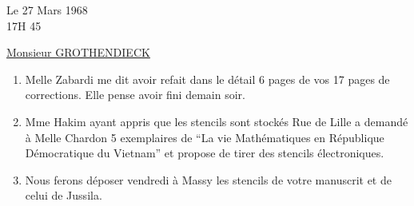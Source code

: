 \begin{flushright}
Le 27 Mars 1968\\
17H 45\\
\end{flushright}

\begin{center}
\uline{Monsieur GROTHENDIECK}\\
\end{center}

\begin{enumerate}[label=\arabic*.]
\item Melle Zabardi me dit avoir refait dans le détail 6 pages de vos 17 pages de corrections. Elle pense avoir fini demain soir.

\item Mme Hakim ayant appris que les stencils sont stockés Rue de Lille a demandé à Melle Chardon 5 exemplaires de ``La vie Mathématiques en République Démocratique du Vietnam'' et propose de tirer des stencils électroniques.

\item Nous ferons déposer vendredi à Massy les stencils de votre manuscrit et de celui de Jussila.
\end{enumerate}

\begin{flushright}
\\
\\
\end{flushright}
